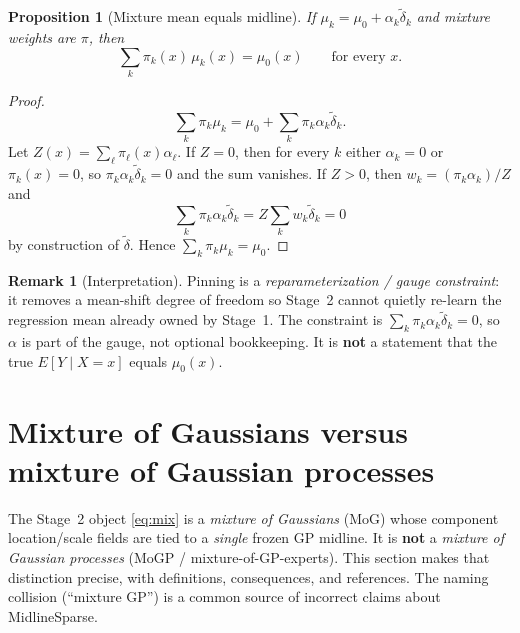 \documentclass[11pt,a4paper]{article}
\theoremstyle{plain}
\newtheorem{proposition}[theorem]{Proposition}
\theoremstyle{definition}
\newtheorem{remark}[theorem]{Remark}
\theoremstyle{remark}
\begin{document}
\begin{proposition}[Mixture mean equals midline]
\label{prop:pin}
If \(\mu_k=\mu_0+\alpha_k\tilde\delta_k\) and mixture weights are \(\pi\), then
\[
  \sum_k\pi_k(x)\,\mu_k(x)
  =
  \mu_0(x)
  \qquad\text{for every }x.
\]
\end{proposition}

\begin{proof}
\[
  \sum_k\pi_k\mu_k
  =
  \mu_0
  +
  \sum_k\pi_k\alpha_k\tilde\delta_k.
\]
Let \(Z(x)=\sum_\ell\pi_\ell(x)\alpha_\ell\). If \(Z=0\), then for every \(k\) either
\(\alpha_k=0\) or \(\pi_k(x)=0\), so \(\pi_k\alpha_k\tilde\delta_k=0\) and the sum
vanishes. If \(Z>0\), then \(w_k=(\pi_k\alpha_k)/Z\) and
\[
  \sum_k\pi_k\alpha_k\tilde\delta_k
  =
  Z\sum_k w_k\tilde\delta_k
  =
  0
\]
by construction of \(\tilde\delta\). Hence
\(\sum_k\pi_k\mu_k=\mu_0\).
\end{proof}

\begin{remark}[Interpretation]
Pinning is a \emph{reparameterization / gauge constraint}: it removes a mean-shift
degree of freedom so Stage~2 cannot quietly re-learn the regression mean already
owned by Stage~1. The constraint is \(\sum_k\pi_k\alpha_k\tilde\delta_k=0\), so
\(\alpha\) is part of the gauge, not optional bookkeeping. It is \textbf{not} a
statement that the true \(E[Y\mid X=x]\) equals \(\mu_0(x)\).
\end{remark}

\section{Mixture of Gaussians versus mixture of Gaussian processes}
\label{sec:mog-vs-mogp}

The Stage~2 object \eqref{eq:mix} is a \emph{mixture of Gaussians} (MoG) whose
component location/scale fields are tied to a \emph{single} frozen GP midline.
It is \textbf{not} a \emph{mixture of Gaussian processes} (MoGP / mixture-of-GP-experts).
This section makes that distinction precise, with definitions, consequences, and
references. The naming collision (``mixture GP'') is a common source of incorrect
claims about MidlineSparse.
\end{document}
